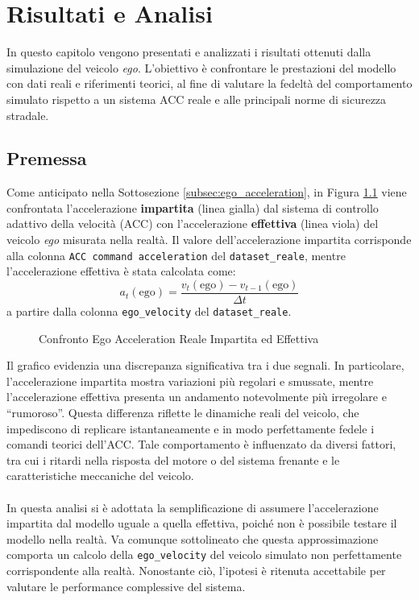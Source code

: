 \chapter{Risultati e Analisi}
\label{cha:risultati}
In questo capitolo vengono presentati e analizzati i risultati ottenuti dalla simulazione del veicolo \emph{ego}. 
L'obiettivo è confrontare le prestazioni del modello con dati reali e riferimenti teorici, al fine di valutare la 
fedeltà del comportamento simulato rispetto a un sistema ACC reale e alle principali norme di sicurezza stradale.

\section{Premessa}
\label{sec:premessa}
Come anticipato nella Sottosezione \ref{subsec:ego_acceleration}, in Figura \ref{fig:acceleration_effettiva_impartita} 
viene confrontata l'accelerazione \textbf{impartita} (linea gialla) dal sistema di controllo adattivo della velocità (ACC) 
con l'accelerazione \textbf{effettiva} (linea viola) del veicolo \emph{ego} misurata nella realtà.  
Il valore dell'accelerazione impartita corrisponde alla colonna \texttt{ACC command acceleration} del \texttt{dataset\_reale}, 
mentre l'accelerazione effettiva è stata calcolata come:
\[
a_t(\mathrm{ego}) = \frac{v_t(\mathrm{ego}) - v_{t-1}(\mathrm{ego})}{\Delta t}
\]
a partire dalla colonna \texttt{ego\_velocity} del \texttt{dataset\_reale}.
\begin{figure}[H]
    \centering
    \caption{Confronto Ego Acceleration Reale Impartita ed Effettiva}
    \label{fig:acceleration_effettiva_impartita}
\end{figure}
\noindent Il grafico evidenzia una discrepanza significativa tra i due segnali.  
In particolare, l'accelerazione impartita mostra variazioni più regolari e smussate, mentre l'accelerazione effettiva presenta un andamento 
notevolmente più irregolare e “rumoroso”.  
Questa differenza riflette le dinamiche reali del veicolo, che impediscono di replicare istantaneamente e in modo perfettamente fedele 
i comandi teorici dell'ACC.  
Tale comportamento è influenzato da diversi fattori, tra cui i ritardi nella risposta del motore o del sistema frenante 
e le caratteristiche meccaniche del veicolo.
\\\\
\noindent In questa analisi si è adottata la semplificazione di assumere l'accelerazione impartita dal modello uguale a quella 
effettiva, poiché non è possibile testare il modello nella realtà. Va comunque sottolineato che questa approssimazione 
comporta un calcolo della \texttt{ego\_velocity} del veicolo simulato non perfettamente corrispondente alla realtà.  
Nonostante ciò, l'ipotesi è ritenuta accettabile per valutare le performance complessive del sistema.







